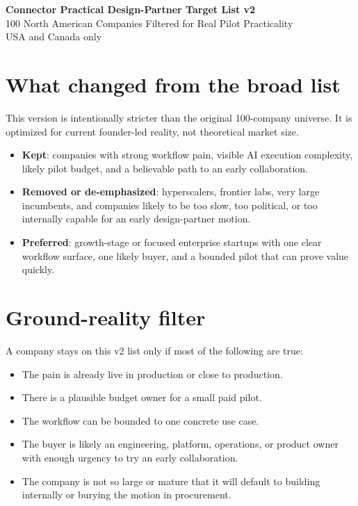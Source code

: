 \documentclass[11pt]{article}
\begin{document}
\small
\begin{center}
{\LARGE \textbf{Connector Practical Design-Partner Target List v2}}\\[0.3em]
{\large 100 North American Companies Filtered for Real Pilot Practicality}\\[0.4em]
{\normalsize USA and Canada only}
\end{center}

\section{What changed from the broad list}
This version is intentionally stricter than the original 100-company universe. It is optimized for current founder-led reality, not theoretical market size.
\begin{itemize}
\item \textbf{Kept}: companies with strong workflow pain, visible AI execution complexity, likely pilot budget, and a believable path to an early collaboration.
\item \textbf{Removed or de-emphasized}: hyperscalers, frontier labs, very large incumbents, and companies likely to be too slow, too political, or too internally capable for an early design-partner motion.
\item \textbf{Preferred}: growth-stage or focused enterprise startups with one clear workflow surface, one likely buyer, and a bounded pilot that can prove value quickly.
\end{itemize}

\section{Ground-reality filter}
A company stays on this v2 list only if most of the following are true:
\begin{itemize}
\item The pain is already live in production or close to production.
\item There is a plausible budget owner for a small paid pilot.
\item The workflow can be bounded to one concrete use case.
\item The buyer is likely an engineering, platform, operations, or product owner with enough urgency to try an early collaboration.
\item The company is not so large or mature that it will default to building internally or burying the motion in procurement.
\end{itemize}
\end{document}
